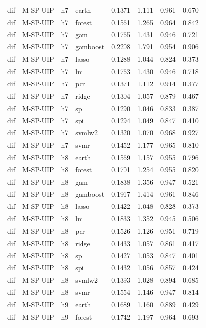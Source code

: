 \begin{ThreePartTable}
\begin{longtable}[t]{llclcccc}
dif & M-SP-UIP & h7 & earth & 0.1371 & 1.111 & 0.961 & 0.670\\
dif & M-SP-UIP & h7 & forest & 0.1561 & 1.265 & 0.964 & 0.842\\
dif & M-SP-UIP & h7 & gam & 0.1765 & 1.431 & 0.946 & 0.721\\
dif & M-SP-UIP & h7 & gamboost & 0.2208 & 1.791 & 0.954 & 0.906\\
dif & M-SP-UIP & h7 & lasso & 0.1288 & 1.044 & 0.824 & 0.373\\
dif & M-SP-UIP & h7 & lm & 0.1763 & 1.430 & 0.946 & 0.718\\
dif & M-SP-UIP & h7 & pcr & 0.1371 & 1.112 & 0.914 & 0.377\\
dif & M-SP-UIP & h7 & ridge & 0.1304 & 1.057 & 0.879 & 0.467\\
dif & M-SP-UIP & h7 & sp & 0.1290 & 1.046 & 0.833 & 0.387\\
dif & M-SP-UIP & h7 & spi & 0.1294 & 1.049 & 0.847 & 0.410\\
dif & M-SP-UIP & h7 & svmlw2 & 0.1320 & 1.070 & 0.968 & 0.927\\
dif & M-SP-UIP & h7 & svmr & 0.1452 & 1.177 & 0.965 & 0.810\\
\addlinespace
dif & M-SP-UIP & h8 & earth & 0.1569 & 1.157 & 0.955 & 0.796\\
dif & M-SP-UIP & h8 & forest & 0.1701 & 1.254 & 0.955 & 0.820\\
dif & M-SP-UIP & h8 & gam & 0.1838 & 1.356 & 0.947 & 0.521\\
dif & M-SP-UIP & h8 & gamboost & 0.1917 & 1.414 & 0.961 & 0.846\\
dif & M-SP-UIP & h8 & lasso & 0.1422 & 1.048 & 0.828 & 0.373\\
dif & M-SP-UIP & h8 & lm & 0.1833 & 1.352 & 0.945 & 0.506\\
dif & M-SP-UIP & h8 & pcr & 0.1526 & 1.126 & 0.951 & 0.719\\
dif & M-SP-UIP & h8 & ridge & 0.1433 & 1.057 & 0.861 & 0.417\\
dif & M-SP-UIP & h8 & sp & 0.1427 & 1.053 & 0.847 & 0.401\\
dif & M-SP-UIP & h8 & spi & 0.1432 & 1.056 & 0.857 & 0.424\\
dif & M-SP-UIP & h8 & svmlw2 & 0.1393 & 1.028 & 0.894 & 0.685\\
dif & M-SP-UIP & h8 & svmr & 0.1554 & 1.146 & 0.947 & 0.814\\
\addlinespace
dif & M-SP-UIP & h9 & earth & 0.1689 & 1.160 & 0.889 & 0.429\\
dif & M-SP-UIP & h9 & forest & 0.1742 & 1.197 & 0.964 & 0.693\\

\end{longtable}
\end{ThreePartTable}

